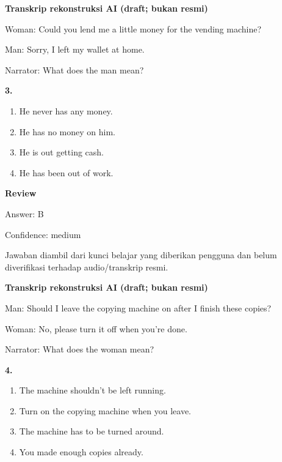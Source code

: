 \documentclass[12pt]{article}
\begin{document}
\begin{exampleblock}
\textbf{Transkrip rekonstruksi AI (draft; bukan resmi)}\par
Woman: Could you lend me a little money for the vending machine?\par
Man: Sorry, I left my wallet at home.\par
Narrator: What does the man mean?\par
\end{exampleblock}
\noindent\textbf{3.}
\begin{enumerate}[label=(\Alph*),leftmargin=*,itemsep=0.2em]
\item He never has any money.
\item He has no money on him.
\item He is out getting cash.
\item He has been out of work.
\end{enumerate}
\par
\begingroup
\setlength{\parskip}{0pt}
\setlength{\parindent}{0pt}
\textbf{Review}\par
Answer: B\par
Confidence: medium\par
Jawaban diambil dari kunci belajar yang diberikan pengguna dan belum diverifikasi terhadap audio/transkrip resmi.\par
\endgroup
\par
\vspace{0.25\baselineskip}
\begin{exampleblock}
\textbf{Transkrip rekonstruksi AI (draft; bukan resmi)}\par
Man: Should I leave the copying machine on after I finish these copies?\par
Woman: No, please turn it off when you're done.\par
Narrator: What does the woman mean?\par
\end{exampleblock}
\noindent\textbf{4.}
\begin{enumerate}[label=(\Alph*),leftmargin=*,itemsep=0.2em]
\item The machine shouldn't be left running.
\item Turn on the copying machine when you leave.
\item The machine has to be turned around.
\item You made enough copies already.
\end{enumerate}
\par
\begingroup
\setlength{\parskip}{0pt}
\end{document}
